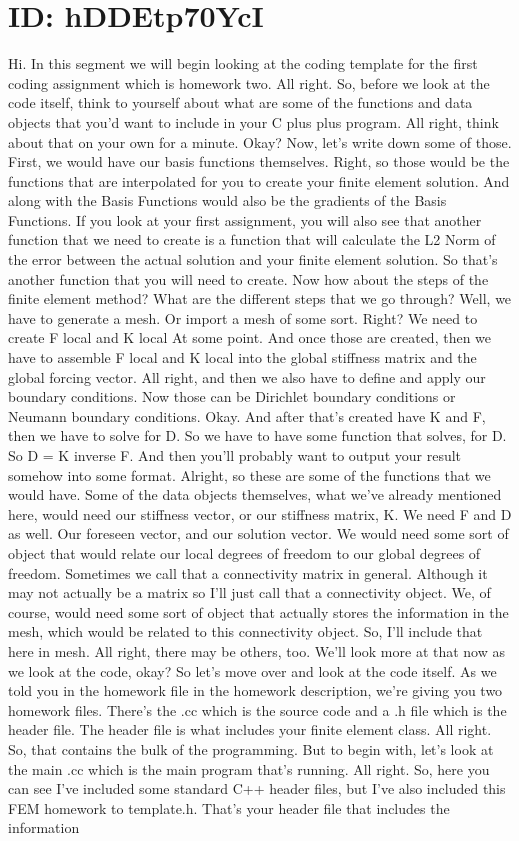 \documentclass[10pt]{article}
\begin{document}
\section*{ID: hDDEtp70YcI}
Hi. In this segment we will begin looking at the coding template for the first coding assignment which is homework two. All right. So, before we look at the code itself, think to yourself about what are some of the functions and data objects that you'd want to include in your C plus plus program. All right, think about that on your own for a minute. Okay? Now, let's write down some of those. First, we would have our basis functions themselves. Right, so those would be the functions that are interpolated for you to create your finite element solution. And along with the Basis Functions would also be the gradients of the Basis Functions. If you look at your first assignment, you will also see that another function that we need to create is a function that will calculate the L2 Norm of the error between the actual solution and your finite element solution. So that's another function that you will need to create. Now how about the steps of the finite element method? What are the different steps that we go through? Well, we have to generate a mesh. Or import a mesh of some sort. Right? We need to create F local and K local At some point. And once those are created, then we have to assemble F local and K local into the global stiffness matrix and the global forcing vector. All right, and then we also have to define and apply our boundary conditions. Now those can be Dirichlet boundary conditions or Neumann boundary conditions. Okay. And after that's created have K and F, then we have to solve for D. So we have to have some function that solves, for D. So D = K inverse F. And then you'll probably want to output your result somehow into some format. Alright, so these are some of the functions that we would have. Some of the data objects themselves, what we've already mentioned here, would need our stiffness vector, or our stiffness matrix, K. We need F and D as well. Our foreseen vector, and our solution vector. We would need some sort of object that would relate our local degrees of freedom to our global degrees of freedom. Sometimes we call that a connectivity matrix in general. Although it may not actually be a matrix so I'll just call that a connectivity object. We, of course, would need some sort of object that actually stores the information in the mesh, which would be related to this connectivity object. So, I'll include that here in mesh. All right, there may be others, too. We'll look more at that now as we look at the code, okay? So let's move over and look at the code itself. As we told you in the homework file in the homework description, we're giving you two homework files. There's the .cc which is the source code and a .h file which is the header file. The header file is what includes your finite element class. All right. So, that contains the bulk of the programming. But to begin with, let's look at the main .cc which is the main program that's running. All right. So, here you can see I've included some standard C++ header files, but I've also included this FEM homework to template.h. That's your header file that includes the information 
\end{document}
